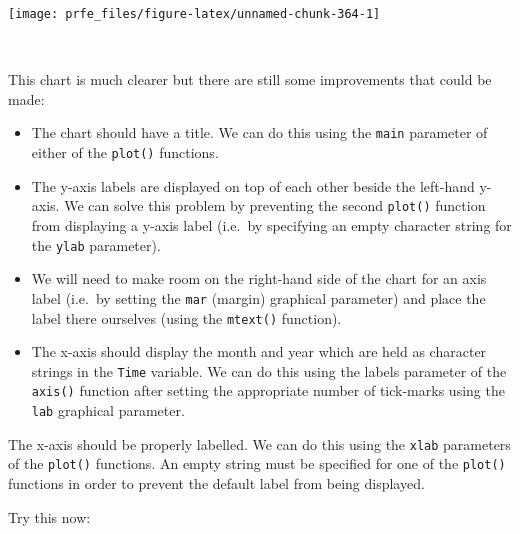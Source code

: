 \documentclass[12pt,a4paper]{book}
\theoremstyle{definition}
\theoremstyle{definition}
\theoremstyle{definition}
\theoremstyle{remark}
\begin{document}
\begin{center}\texttt{[image: prfe\_files/figure-latex/unnamed-chunk-364-1]} \end{center}

~

This chart is much clearer but there are still some improvements that
could be made:

\begin{itemize}
\item
  The chart should have a title. We can do this using the \texttt{main}
  parameter of either of the \texttt{plot()} functions.
\item
  The y-axis labels are displayed on top of each other beside the
  left-hand y-axis. We can solve this problem by preventing the second
  \texttt{plot()} function from displaying a y-axis label (i.e.~by
  specifying an empty character string for the \texttt{ylab} parameter).
\item
  We will need to make room on the right-hand side of the chart for an
  axis label (i.e.~by setting the \texttt{mar} (margin) graphical
  parameter) and place the label there ourselves (using the
  \texttt{mtext()} function).
\item
  The x-axis should display the month and year which are held as
  character strings in the \texttt{Time} variable. We can do this using
  the labels parameter of the \texttt{axis()} function after setting the
  appropriate number of tick-marks using the \texttt{lab} graphical
  parameter.
\end{itemize}

The x-axis should be properly labelled. We can do this using the
\texttt{xlab} parameters of the \texttt{plot()} functions. An empty
string must be specified for one of the \texttt{plot()} functions in
order to prevent the default label from being displayed.

Try this now:

~
\end{document}
